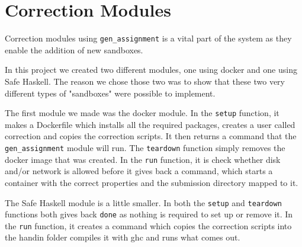 \section{Correction Modules}
Correction modules using \texttt{gen\_assignment} is a vital part of the system
as they enable the addition of new sandboxes.

In this project we created two different modules, one using docker and one using
Safe Haskell. The reason we chose those two was to show that these two very
different types of "sandboxes" were possible to implement.

The first module we made was the docker module. In the \texttt{setup} function,
it makes a Dockerfile which installs all the required packages, creates a user
called correction and copies the correction scripts. It then returns a command
that the \texttt{gen\_assignment} module will run.
The \texttt{teardown} function simply removes the docker image that was created.
In the \texttt{run} function, it is check whether disk and/or network is allowed
before it gives back a command, which starts a container with the correct
properties and the submission directory mapped to it.


The Safe Haskell module is a little smaller. In both the \texttt{setup} and
\texttt{teardown} functions both gives back \texttt{done} as nothing is required
to set up or remove it. In the \texttt{run} function, it creates a command which
copies the correction scripts into the handin folder compiles it with ghc and
runs what comes out.

